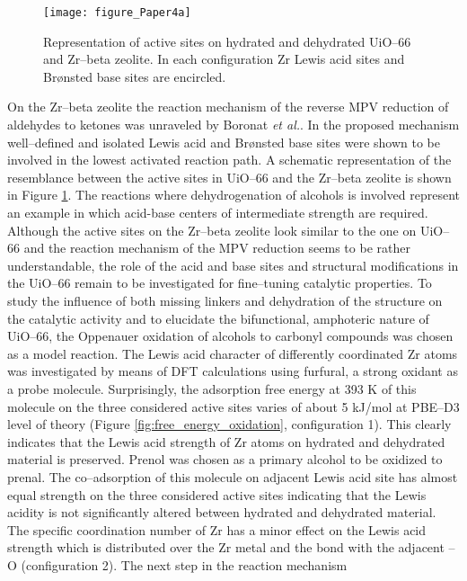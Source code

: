 \begin{figure}[!htp]
	\centering
	\texttt{[image: figure\_Paper4a]}
	\caption{Representation of active sites on hydrated and dehydrated UiO--66 and
	Zr--beta zeolite. In each configuration Zr Lewis acid sites
	and Br\o{}nsted base sites are
	encircled.}
	\label{fig:figure_Paper4a}
\end{figure}
\npar
On the Zr--beta zeolite the reaction mechanism of the
reverse MPV reduction of aldehydes to ketones was
unraveled by Boronat \textit{et al.}\cite{Boronat2006}. In the proposed
mechanism well--defined and isolated Lewis acid and Br\o{}nsted base sites were shown to
be involved in the lowest activated reaction path. A schematic representation of the
resemblance between the active sites in UiO--66 and the Zr--beta zeolite is
shown in Figure \ref{fig:figure_Paper4a}.
The reactions where dehydrogenation of alcohols is involved represent an example
in which acid-base centers of intermediate strength are required. Although the
active sites on the Zr--beta zeolite look similar to the one on UiO--66 and the
reaction mechanism of the MPV reduction seems to be rather understandable, 
the role of the acid and base sites and structural modifications in the UiO--66
remain to be investigated for fine--tuning catalytic properties. To
study the influence of both missing linkers and dehydration of the structure on
the catalytic activity and to elucidate the bifunctional, amphoteric nature of
UiO--66, the Oppenauer oxidation of alcohols to carbonyl compounds was chosen as
a model reaction.
The Lewis acid character of differently coordinated Zr atoms was investigated by
means of DFT calculations using furfural, a strong oxidant as a probe molecule.
Surprisingly, the adsorption free energy at 393 K of this molecule on the three
considered active sites varies of about 5 kJ/mol at PBE--D3 level of theory
(Figure \ref{fig:free_energy_oxidation}, configuration 1).
This clearly indicates that the Lewis acid strength of Zr atoms on hydrated and
dehydrated material is preserved. Prenol was chosen as a primary alcohol to be
oxidized to prenal. The co--adsorption of this molecule on adjacent Lewis acid site has almost equal strength on the three considered active sites indicating that the Lewis acidity is not significantly altered between hydrated and dehydrated material. The specific coordination number of Zr has a minor effect on the Lewis acid strength which is distributed over the Zr metal and the bond with the adjacent --O (configuration 2). The next step in the reaction mechanism
